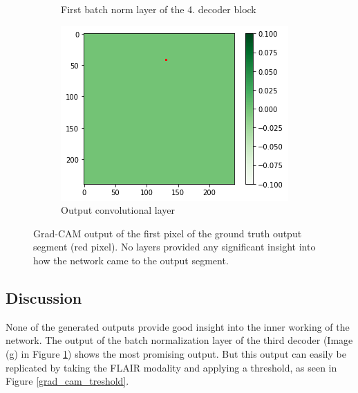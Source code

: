 \begin{figure}[H]
\begin{subfigure}{.32\textwidth}
        \caption{First batch norm layer of the 4. decoder block}
    \end{subfigure}\hfill%
    \begin{subfigure}{.32\textwidth}
        \centering
        \includegraphics[width=\linewidth]{chapters/04_segmentation/images/grad_cam_36.png}
        \caption{Output convolutional layer}
    \end{subfigure}
    \caption{Grad-CAM output of the first pixel of the ground truth output segment (red pixel). No layers provided any significant insight into how the network came to the output segment.}
    \label{grad_cam_brats_result}
\end{figure}

\subsection{Discussion}
None of the generated outputs provide good insight into the inner working of the network. The output of the batch normalization layer of the third decoder (Image (g) in Figure \ref{grad_cam_brats_result}) shows the most promising output. But this output can easily be replicated by taking the FLAIR modality and applying a threshold, as seen in Figure \ref{grad_cam_treshold}.

